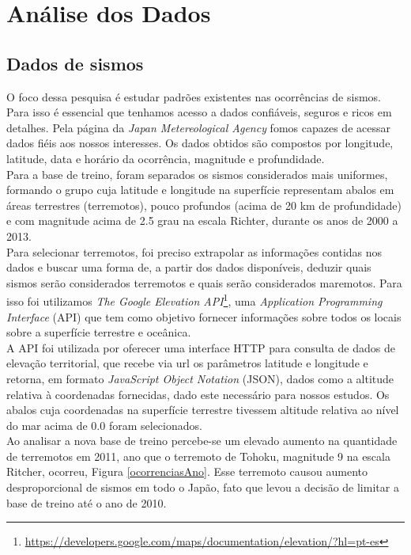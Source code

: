 \chapter{Análise dos Dados}

\section{Dados de sismos}
O foco dessa pesquisa é estudar padrões existentes nas ocorrências de sismos. Para isso é essencial que tenhamos acesso a dados confiáveis, seguros e ricos em detalhes. Pela página da {\it Japan Metereological Agency} fomos capazes de acessar dados fiéis aos nossos interesses. Os dados obtidos são compostos por longitude, latitude, data e horário da ocorrência, magnitude e profundidade. \\

Para a base de treino, foram separados os sismos considerados mais uniformes, formando o grupo cuja latitude e longitude na superfície representam abalos em áreas terrestres (terremotos), pouco profundos (acima de 20 km de profundidade) e com magnitude acima de 2.5 grau na escala Richter, durante os anos de 2000 a 2013.\\

Para selecionar terremotos, foi preciso extrapolar as informações contidas nos dados e buscar uma forma de, a partir dos dados disponíveis, deduzir quais sismos serão considerados terremotos e quais serão considerados maremotos. Para isso foi utilizamos {\it The Google Elevation API}\footnote[3]{\url {https://developers.google.com/maps/documentation/elevation/?hl=pt-es}}, uma {\it Application Programming Interface} (API) que tem como objetivo fornecer informações sobre todos os locais sobre a superfície terrestre e oceânica. \\

A API foi utilizada por oferecer uma interface HTTP para consulta de dados de elevação territorial, que recebe via url os parâmetros latitude e longitude e retorna, em formato {\it JavaScript Object Notation} (JSON), dados como a altitude relativa à coordenadas fornecidas, dado este necessário para nossos estudos. Os abalos cuja coordenadas na superfície terrestre tivessem altitude relativa ao nível do mar acima de 0.0 foram selecionados.\\

Ao analisar a nova base de treino percebe-se um elevado aumento na quantidade de terremotos em 2011, ano que o terremoto de Tohoku, magnitude 9 na escala Ritcher, ocorreu, Figura \ref{ocorrenciasAno}. Esse terremoto causou aumento desproporcional de sismos em todo o Japão, fato que levou a decisão de limitar a base de treino até o ano de 2010.\\

